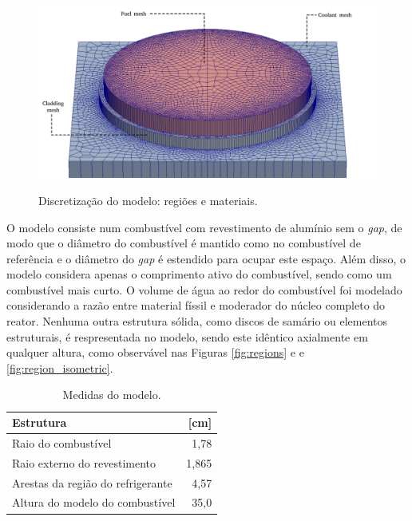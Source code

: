 \begin{figure}[htb]
  \caption{Discretização do modelo: regiões e materiais.}
  \centering\includegraphics[scale=0.5]{figuras/regioes_edges_com_legenda_ingles.png}
  \label{fig:modelo_exploded}
\end{figure}

O modelo consiste num combustível com revestimento de alumínio sem
o \textit{gap}, de modo que o diâmetro do combustível é mantido como no
combustível de referência e o diâmetro do \textit{gap} é estendido para
ocupar este espaço. Além disso, o modelo considera apenas o comprimento
ativo do combustível, sendo como um combustível mais curto. O volume
de água ao redor do combustível foi modelado considerando a razão entre
material físsil e moderador do núcleo completo do reator. Nenhuma outra
estrutura sólida, como discos de samário ou elementos estruturais, é
respresentada no modelo, sendo este idêntico axialmente em qualquer
altura, como observável nas Figuras \ref{fig:regions} e  e \ref{fig:region_isometric}.

\begin{table}[htb]
  \centering
  \caption[Medidas do modelo.]{Medidas do modelo.}
  \label{tab:size_model}
  \begin{tabular}{lr}
    Estrutura                         & {[}cm{]} \\ \hline
    Raio do combustível               & 1,78     \\
    Raio externo do revestimento      & 1,865    \\
    Arestas da região do refrigerante & 4,57     \\ \hline
    Altura do modelo do combustível   & 35,0    
  \end{tabular}
\end{table}

